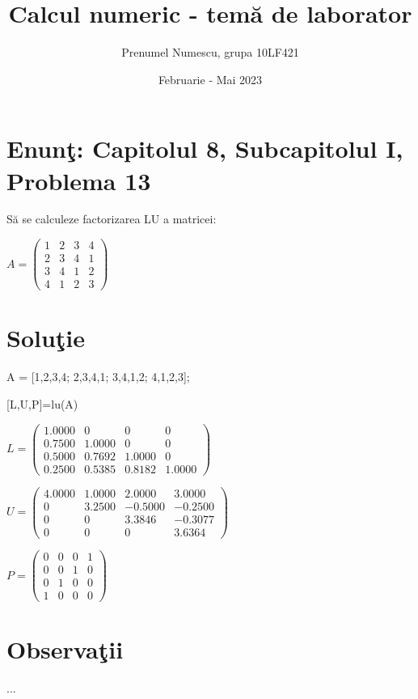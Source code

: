 \documentclass{article}
\begin{document}
\title{Calcul numeric - tem\u{a} de laborator}

\author{Prenumel Numescu, grupa 10LF421}

\date{Februarie - Mai 2023}

\maketitle

\section*{Enun\c{t}: Capitolul 8, Subcapitolul I, Problema 13}

S\u{a} se calculeze factorizarea LU a matricei:
\begin{center}
$
A=\begin{pmatrix}
1 & 2 & 3 & 4\\
2 & 3 & 4 & 1\\
3 & 4 & 1 & 2\\
4 & 1 & 2 & 3
\end{pmatrix}
$
\end{center}

\section*{Solu\c{t}ie}

\begin{center}
    A = [1,2,3,4; 2,3,4,1; 3,4,1,2; 4,1,2,3];
\end{center}
\begin{center}
    [L,U,P]=lu(A)
\end{center}

\begin{center}
$
L =\begin{pmatrix}

    1.0000  &       0  &       0  &       0\\
    0.7500  &  1.0000  &       0  &       0\\
    0.5000  &  0.7692  &  1.0000  &       0\\
    0.2500  &  0.5385  &  0.8182  &  1.0000
\end{pmatrix}
$
\end{center}

\begin{center}
$
U =\begin{pmatrix}
  4.0000  &  1.0000  &  2.0000  &  3.0000\\
    0  &  3.2500  & -0.5000 &  -0.2500\\
    0  & 0  &  3.3846  & -0.3077\\
    0  & 0  &  0  &  3.6364
\end{pmatrix}
$
\end{center} 

\begin{center}
$
P =\begin{pmatrix}
  0  &   0  &   0   & 1\\
  0  &   0  &   1   &  0\\
  0  &   1  &   0   &  0\\
  1  &   0  &   0   &  0
\end{pmatrix}
$
\end{center}
    

\section*{Observa\c{t}ii}

...
\end{document}
